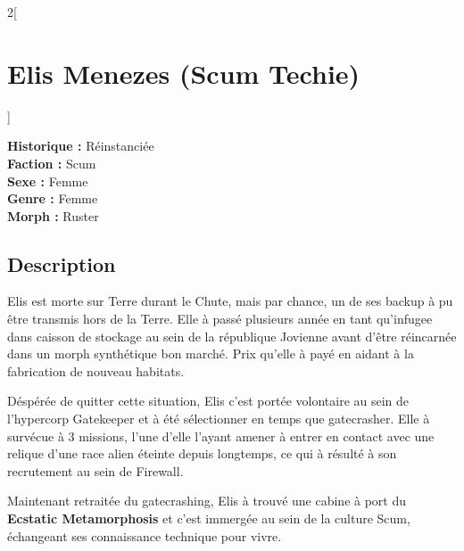 \documentclass[a4paper,9pt]{article}
\begin{document}
\begin{multicols}{2}[\section*{Elis Menezes (Scum Techie)}]

   \noindent\textbf{Historique :} Réinstanciée\\
   \noindent\textbf{Faction :} Scum\\
   \noindent\textbf{Sexe :} Femme\\
   \noindent\textbf{Genre :} Femme\\
   \noindent\textbf{Morph :} Ruster\\

   \subsection*{Description}

   Elis est morte sur Terre durant le Chute, mais par chance, un de ses backup à
   pu être transmis hors de la Terre.
   Elle à passé plusieurs année en tant qu'infugee dans caisson de stockage
   au sein de la république Jovienne avant d'être réincarnée dans un morph
   synthétique bon marché. Prix qu'elle à payé en aidant à la fabrication
   de nouveau habitats.

   Déspérée de quitter cette situation, Elis c'est portée volontaire au sein
   de l'hypercorp Gatekeeper et à été sélectionner en temps que gatecrasher.
   Elle à survécue à 3 missions, l'une d'elle l'ayant amener à entrer en contact
   avec une relique d'une race alien éteinte depuis longtemps, ce qui à résulté
   à son recrutement au sein de Firewall.

   Maintenant retraitée du gatecrashing, Elis à trouvé une cabine à port du
   \textbf{Ecstatic Metamorphosis} et c'est immergée au sein de la culture
   Scum, échangeant ses connaissance technique pour vivre.


\end{multicols}
\end{document}
